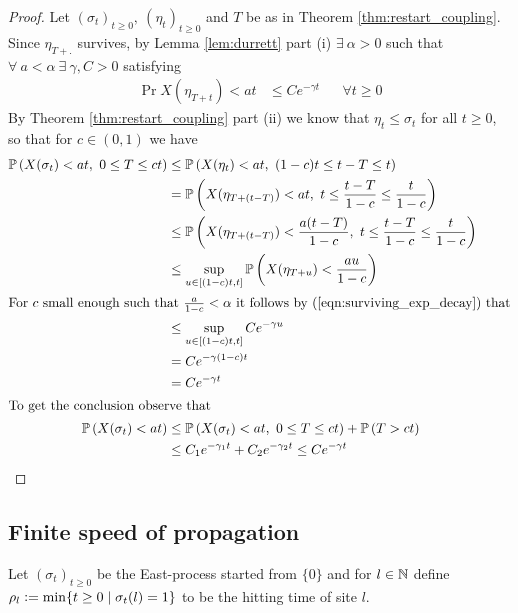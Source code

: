 \begin{proof}
Let $(\sigma_t)_{t \geq 0},\ (\eta_t)_{t \geq 0}$ and $T$ be as in Theorem \ref{thm:restart_coupling}. Since $\eta_{T + .}$ survives, by Lemma \ref{lem:durrett} part (i) $\exists\ \alpha > 0$ such that $\forall\ a < \alpha\ \exists\ \gamma, C > 0$ satisfying 
\begin{align}\label{eqn:surviving_exp_decay}
  \Pr{X(\eta_{T+t}) < at} &\leq C e^{- \gamma t}  &&\forall t \geq 0
\end{align}
By Theorem \ref{thm:restart_coupling} part (ii) we know that $\eta_t \leq \sigma_t$ for all $t \geq 0$, so that for $c \in (0,1)$ we have
\begin{align*}
  \Pr{X(\sigma_t) < at,\ 0 \leq T \leq ct} &\leq \Pr{X(\eta_t) < at,\ (1-c)t \leq t-T \leq t} \\
                                           &=    \Pr{X(\eta_{T + (t - T)}) < at,\ t \leq \frac{t-T}{1-c} \leq \frac{t}{1-c}} \\
                                           &\leq \Pr{X(\eta_{T + (t - T)}) < \frac{a(t - T)}{1-c},\ t \leq \frac{t-T}{1-c} \leq \frac{t}{1-c}} \\
                                           &\leq \sup\limits_{u \in [(1-c)t,t]} \Pr{X(\eta_{T + u}) < \frac{au}{1-c}} \\
  \intertext{For $c$ small enough such that $\frac{a}{1-c} < \alpha$ it follows by (\ref{eqn:surviving_exp_decay}) that}
                                           &\leq \sup\limits_{u \in [(1-c)t,t]} C e^{-\gamma u} \\
                                           &= C e^{-\gamma (1-c) t} \\
                                           &= C e^{-\gamma t} \\ 
  \intertext{To get the conclusion observe that}
    \Pr{X(\sigma_t) < at}  &\leq \Pr{X(\sigma_t) < at,\ 0 \leq T \leq ct} + \Pr{T > ct} \\
                           &\leq C_1 e^{-\gamma_1 t} + C_2 e^{-\gamma_2 t} \leq C e^{-\gamma t}
\end{align*}
\end{proof}

\subsection{Finite speed of propagation}

\begin{definition}\label{def:hitting_times}
Let $(\sigma_t)_{t \geq 0}$ be the East-process started from $\{0\}$ and for $l \in \N$ define $\rho_l \defeq \min\{ t \geq 0 \mid \sigma_t(l) = 1\}$ to be the hitting time of site $l$. 
\end{definition}

